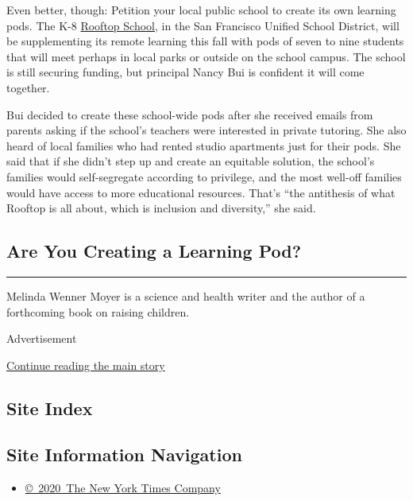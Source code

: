 Even better, though: Petition your local public school to create its own
learning pods. The K-8 \href{https://rooftopk8.org/}{Rooftop School}, in
the San Francisco Unified School District, will be supplementing its
remote learning this fall with pods of seven to nine students that will
meet perhaps in local parks or outside on the school campus. The school
is still securing funding, but principal Nancy Bui is confident it will
come together.

Bui decided to create these school-wide pods after she received emails
from parents asking if the school's teachers were interested in private
tutoring. She also heard of local families who had rented studio
apartments just for their pods. She said that if she didn't step up and
create an equitable solution, the school's families would self-segregate
according to privilege, and the most well-off families would have access
to more educational resources. That's ``the antithesis of what Rooftop
is all about, which is inclusion and diversity,'' she said.

\hypertarget{are-you-creating-a-learning-pod}{%
\subsection{Are You Creating a Learning
Pod?}\label{are-you-creating-a-learning-pod}}

\begin{center}\rule{0.5\linewidth}{\linethickness}\end{center}

Melinda Wenner Moyer is a science and health writer and the author of a
forthcoming book on raising children.

Advertisement

\protect\hyperlink{after-bottom}{Continue reading the main story}

\hypertarget{site-index}{%
\subsection{Site Index}\label{site-index}}

\hypertarget{site-information-navigation}{%
\subsection{Site Information
Navigation}\label{site-information-navigation}}

\begin{itemize}
\tightlist
\item
  \href{https://help.nytimes3xbfgragh.onion/hc/en-us/articles/115014792127-Copyright-notice}{©~2020~The
  New York Times Company}
\end{itemize}

